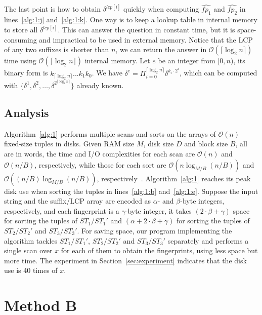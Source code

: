 \documentclass[10pt,journal,compsoc]{IEEEtran}
\begin{document}
The last point is how to obtain $\delta^{lcp[i]}$ quickly when computing $\hat{fp_1}$ and $\hat{fp_2}$ in lines~\ref{alg:1:j} and~\ref{alg:1:k}. One way is to keep a lookup table in internal memory to store all $\delta^{lcp[i]}$. This can answer the question in constant time, but it is space-consuming and impractical to be used in external memory. Notice that the LCP of any two suffixes is shorter than $n$, we can return the answer in $\mathcal{O}(\lceil \log_2{n} \rceil)$ time using $\mathcal{O}(\lceil \log_2{n} \rceil)$ internal memory. Let $e$ be an integer from $[0, n)$, its binary form is $k_{\lceil \log_2{n} \rceil}...k_1k_0$. We have $\delta^e = \Pi_{i = 0}^{\lceil \log_2{n} \rceil}{\delta}^{k_i \cdot 2^i}$, which can be computed with $\{{\delta}^{1}, {\delta}^{2}, \dots, {\delta}^{2^{\lceil \log_2{n} \rceil}} \}$ already known.

\subsection{Analysis} \label{sec:method1:analysis}


Algorithm~\ref{alg:1} performs multiple scans and sorts on the arrays of $\mathcal{O}(n)$ fixed-size tuples in disks. Given RAM size $M$, disk size $D$ and block size $B$, all are in words, the time and I/O complexities for each scan are $\mathcal{O}(n)$ and $\mathcal{O}(n / B)$, respectively, while those for each sort are $\mathcal{O}(n\log_{M/ B}(n / B))$ and $\mathcal{O}((n / B)\log_{M / B}(n / B))$, respectively~\cite{Arge2013}. Algorithm~\ref{alg:1} reaches its peak disk use when sorting the tuples in lines~\ref{alg:1:b} and~\ref{alg:1:e}. Suppose the input string and the suffix/LCP array are encoded as $\alpha$- and $\beta$-byte integers, respectively, and each fingerprint is a $\gamma$-byte integer, it takes $(2 \cdot \beta + \gamma)$ space for sorting the tuples of $ST_1/ST_1'$ and $(\alpha + 2 \cdot \beta + \gamma)$ for sorting the tuples of $ST_2/ST_2'$ and $ST_3/ST_3'$. For saving space, our program implementing the algorithm tackles $ST_1/ST_1'$, $ST_2/ST_2'$ and $ST_3/ST_3'$ separately and performs a single scan over $x$ for each of them to obtain the fingerprints, using less space but more time. The experiment in Section~\ref{sec:experiment} indicates that the disk use is 40 times of $x$.

\section{Method B} \label{sec:method2}
\end{document}
